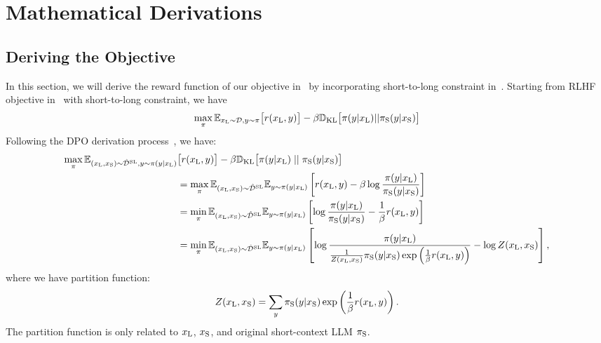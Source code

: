 \section{ Mathematical Derivations}

\subsection{Deriving the \ourMethod{} Objective}
\label{subsec:derive_longpo}
In this section, we will derive the reward function of our \ourMethod{} objective in~ by incorporating short-to-long constraint in~. Starting from RLHF objective in~ with short-to-long constraint, we have
\begin{equation}
\max_{\pi}  \mathbb{E}_{x_\text{L}\sim \mathcal{D}, y\sim \pi}\bigl[r(x_\text{L}, y)\bigr] - \beta\mathbb{D}_{\textrm{KL}}\bigl[\pi(y|x_\text{L})||\pi_\text{S}(y|x_\text{S})\bigr]
\end{equation}
Following the DPO derivation process~\citep{Rafailov2023DirectPO}, we have:
\begin{align}\label{eq:RL_proof}
\max_{\pi}  \mathbb{E}_{(x_\text{L}, x_\text{S}) \sim \mathcal{\hat{D}^{\text{SL}}}, y\sim \pi(y|x_\text{L})}&\bigl[r(x_\text{L}, y)\bigr] - \beta\mathbb{D}_{\textrm{KL}}\bigl[\pi(y|x_\text{L})\mid\mid\pi_\text{S}(y|x_\text{S})\bigr] \nonumber\\
&=\max_{\pi}  \mathbb{E}_{(x_\text{L}, x_\text{S}) \sim \mathcal{\hat{D}^{\text{SL}}}}\mathbb{E}_{y\sim \pi(y|x_\text{L})}\left[r(x_\text{L}, y) - \beta\log\frac{\pi(y|x_\text{L})}{\pi_\text{S}(y|x_\text{S})}\right] \nonumber\\&=
\min_{\pi}  \mathbb{E}_{(x_\text{L}, x_\text{S}) \sim \mathcal{\hat{D}^{\text{SL}}}}\mathbb{E}_{y\sim \pi(y|x_\text{L})}\left[\log\frac{\pi(y|x_\text{L})}{\pi_\text{S}(y|x_\text{S})} - \frac{1}{\beta}r(x_\text{L}, y)\right] \nonumber\\ &=
\min_{\pi}  \mathbb{E}_{(x_\text{L}, x_\text{S}) \sim \mathcal{\hat{D}^{\text{SL}}}}\mathbb{E}_{y\sim \pi(y|x_\text{L})}\left[\log\frac{\pi(y|x_\text{L})}{\frac{1}{Z(x_\text{L}, x_\text{S})}\pi_\text{S}(y|x_\text{S})\exp\left(\frac{1}{\beta}r(x_\text{L}, y)\right)} - \log Z(x_\text{L}, x_\text{S})\right],
\end{align}
where we have partition function:
\begin{equation*}
Z(x_\text{L}, x_\text{S}) = \sum_{y}\pi_\text{S}(y|x_\text{S})\exp\left(\frac{1}{\beta}r(x_\text{L}, y)\right).
\end{equation*}
The partition function is only related to $x_\text{L}$, $x_\text{S}$, and original short-context LLM $\pi_\text{S}$.
